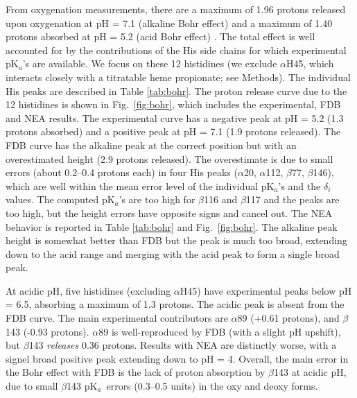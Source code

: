 \documentclass[a4paper,12pt]{article}
\newcommand{\pk}{pK$_a$}
\begin{document}
From oxygenation measurements, there are a maximum of 1.96 protons released upon oxygenation at pH = 7.1
(alkaline Bohr effect) and a maximum of 1.40 protons absorbed at pH = 5.2 (acid Bohr effect) \cite{Ho10}.
The total effect is well accounted for by the contributions of the His side chains for which experimental
\pk's are available. We focus on these 12 histidines (we exclude $\alpha$H45, which interacts closely with
a titratable heme propionate; see Methods). The individual His peaks are described in Table \ref{tab:bohr}.
The proton release curve due to the 12 histidines is shown in Fig.\ \ref{fig:bohr}, which includes the
experimental, FDB and NEA results. The experimental curve has a negative peak at pH = 5.2 (1.3 protons
absorbed) and a positive peak at pH = 7.1 (1.9 protons released). The FDB curve has the alkaline peak at
the correct position but with an overestimated height (2.9 protons released). The overestimate is due to small
errors (about 0.2--0.4 protons each) in four His peaks ($\alpha$20, $\alpha$112, $\beta$77, $\beta$146),
which are well within the mean error level of the individual \pk's and the $\delta_i$ values. The computed
\pk's are too high for $\beta$116 and $\beta$117 and the peaks are too high, but the height errors have
opposite signs and cancel out. The NEA behavior is reported in Table \ref{tab:bohr} and Fig.\ \ref{fig:bohr}.
The alkaline peak height is somewhat better than FDB but the peak is much too broad, extending down to the
acid range and merging with the acid peak to form a single broad peak.

At acidic pH, five histidines (excluding $\alpha$H45) have experimental peaks below pH = 6.5, absorbing a
maximum of 1.3 protons. The acidic peak is absent from the FDB curve. The main experimental contributors
are $\alpha$89 (+0.61 protons), and $\beta$143 (-0.93 protons). $\alpha$89 is well-reproduced by FDB (with
a slight pH upshift), but $\beta$143 {\it releases} 0.36 protons. Results with NEA are distinctly worse,
with a signel broad positive peak extending down to pH = 4. Overall, the main error in the Bohr effect with
FDB is the lack of proton absorption by $\beta$143 at acidic pH, due to small $\beta$143 \pk\ errors
(0.3--0.5 units) in the oxy and deoxy forms.
\end{document}

